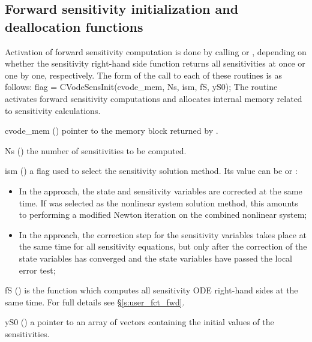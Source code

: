 \subsection{Forward sensitivity initialization and deallocation functions}
\label{ss:sensi_malloc}
Activation of forward sensitivity computation is done by calling
 or , depending on whether the sensitivity
right-hand side function returns all sensitivities at once or one by one, respectively.
The form of the call to each of these routines is as follows:
{
  flag = CVodeSensInit(cvode\_mem, Ns, ism, fS, yS0);
}
{
  The routine  activates forward sensitivity computations and
  allocates internal memory related to sensitivity calculations.
}
{
  \begin{args}

  \item[cvode\_mem] ()
    pointer to the {\cvodes} memory block returned by .

  \item[Ns] () 
    the number of sensitivities to be computed.

  \item[ism] ()
    a flag used to select the sensitivity solution method.  Its value can be
     or :
    \begin{itemize}
    \item In the  approach, the state and sensitivity variables are
      corrected at the same time. If  was selected as the nonlinear system 
      solution method, this amounts to performing a modified Newton iteration on the
      combined nonlinear system;
    \item In the  approach, the correction step for the sensitivity
      variables takes place at the same time for all sensitivity equations, but only after 
      the correction of the state variables has converged and the state variables 
      have passed the local error test; 
    \end{itemize}

  \item[fS] ()
    is the {\C} function which computes all sensitivity ODE right-hand sides at the same time.
    For full details see \S\ref{s:user_fct_fwd}.

  \item[yS0] () 
    a pointer to an array of  vectors containing the initial 
    values of the sensitivities.

  \end{args}
}
